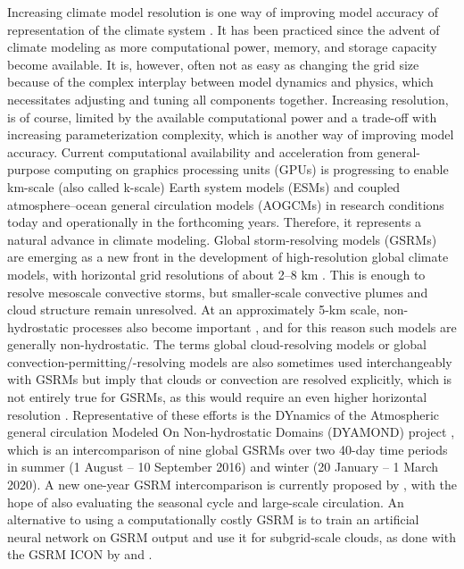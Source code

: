 \documentclass[draft]{agujournal2019}
\begin{document}
Increasing climate model resolution is one way of improving model accuracy of representation of the climate system \cite{mauritsen2022}. It has been practiced since the advent of climate modeling as more computational power, memory, and storage capacity become available. It is, however, often not as easy as changing the grid size because of the complex interplay between model dynamics and physics, which necessitates adjusting and tuning all components together. Increasing resolution, is of course, limited by the available computational power and a trade-off with increasing parameterization complexity, which is another way of improving model accuracy. Current computational availability and acceleration from general-purpose computing on graphics processing units (GPUs) is progressing to enable km-scale (also called k-scale) Earth system models (ESMs) and coupled atmosphere--ocean general circulation models (AOGCMs) in research conditions today and operationally in the forthcoming years. Therefore, it represents a natural advance in climate modeling. Global storm-resolving models (GSRMs) are emerging as a new front in the development of high-resolution global climate models, with horizontal grid resolutions of about 2--8 km \cite{satoh2019,stevens2019}. This is enough to resolve mesoscale convective storms, but smaller-scale convective plumes and cloud structure remain unresolved. At an approximately 5-km scale, non-hydrostatic processes also become important \cite{weisman1997}, and for this reason such models are generally non-hydrostatic. The terms global cloud-resolving models or global convection-permitting/-resolving models are also sometimes used interchangeably with GSRMs but imply that clouds or convection are resolved explicitly, which is not entirely true for GSRMs, as this would require an even higher horizontal resolution \cite{satoh2019}. Representative of these efforts is the DYnamics of the Atmospheric general circulation Modeled On Non-hydrostatic Domains (DYAMOND) project \cite{stevens2019,dyamond}, which is an intercomparison of nine global GSRMs over two 40-day time periods in summer (1 August -- 10 September 2016) and winter (20 January -- 1 March 2020). A new one-year GSRM intercomparison is currently proposed by , with the hope of also evaluating the seasonal cycle and large-scale circulation. An alternative to using a computationally costly GSRM is to train an artificial neural network on GSRM output and use it for subgrid-scale clouds, as done with the GSRM ICON by  and .
\end{document}
